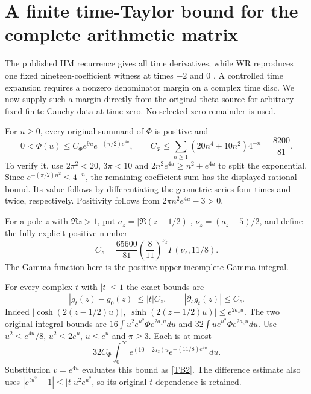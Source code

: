 \documentclass[11pt,a4paper]{article}
\theoremstyle{definition}\newtheorem{definition}[theorem]{Definition}
\begin{document}
\section{A finite time-Taylor bound for the complete arithmetic matrix}
The published HM recurrence gives all time derivatives, while WR reproduces one fixed nineteen-coefficient witness at times $-2$ and $0$ \cite{HM,BT}. A controlled time expansion requires a nonzero denominator margin on a complex time disc. We now supply such a margin directly from the original theta source for arbitrary fixed finite Cauchy data at time zero. No selected-zero remainder is used.

For $u\ge0$, every original summand of $\Phi$ is positive and
\begin{equation}
 0<\Phi(u)\le C_\Phi e^{9u}e^{-(\pi/2)e^{4u}},\qquad
 C_\Phi\le\sum_{n\ge1}(20n^4+10n^2)4^{-n}
            =\frac{8200}{81}.                               \tag{TB1}\label{TB1}
\end{equation}
To verify it, use $2\pi^2<20$, $3\pi<10$ and
$2n^2e^{4u}\ge n^2+e^{4u}$ to split the exponential. Since
$e^{-(\pi/2)n^2}\le4^{-n}$, the remaining coefficient sum has the displayed rational bound. Its value follows by differentiating the geometric series four times and twice, respectively. Positivity follows from $2\pi n^2e^{4u}-3>0$.

For a pole $z$ with $\Re z>1$, put $a_z=|\Re(z-1/2)|$,
$\nu_z=(a_z+5)/2$, and define the fully explicit positive number
\begin{equation}
 C_z=\frac{65600}{81}\left(\frac8{11}\right)^{\nu_z}
                 \Gamma(\nu_z,11/8).                        \tag{TB2}\label{TB2}
\end{equation}
The Gamma function here is the positive upper incomplete Gamma integral.

For every complex $t$ with $|t|\le1$ the exact bounds are
\begin{equation}
 |g_t(z)-g_0(z)|\le |t|C_z,\qquad |\partial_sg_t(z)|\le C_z.
                                                               \tag{TB3}\label{TB3}
\end{equation}
Indeed $|\cosh(2(z-1/2)u)|,|\sinh(2(z-1/2)u)|\le e^{2a_zu}$.
The two original integral bounds are
$16\int u^2e^{u^2}\Phi e^{2a_zu}du$ and
$32\int ue^{u^2}\Phi e^{2a_zu}du$.
Use $u^2\le e^{4u}/8$, $u^2\le2e^u$, $u\le e^u$ and $\pi\ge3$.
Each is at most
\[
 32C_\Phi\int_0^\infty e^{(10+2a_z)u}e^{-(11/8)e^{4u}}\,du.
\]
Substitution $v=e^{4u}$ evaluates this bound as \eqref{TB2}. The difference estimate also uses $|e^{tu^2}-1|\le|t|u^2e^{u^2}$, so its original $t$-dependence is retained.
\end{document}
